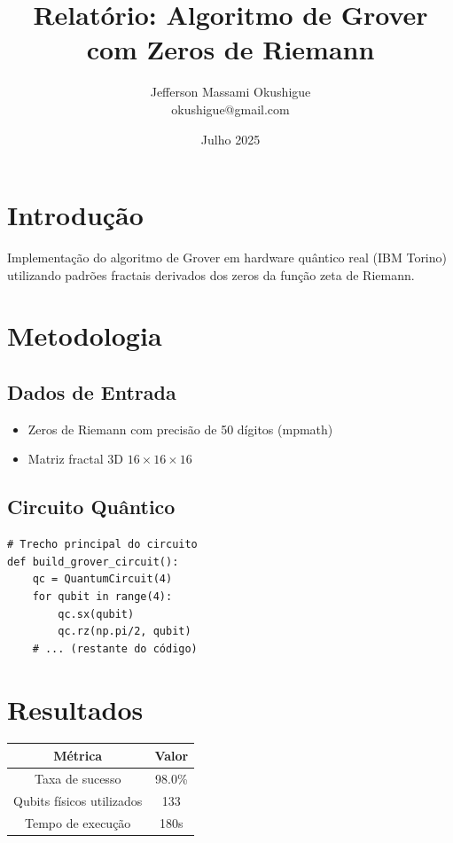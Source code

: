 \documentclass[12pt, a4paper]{article}
\title{Relatório: Algoritmo de Grover com Zeros de Riemann}
\author{Jefferson Massami Okushigue \\ \small{okushigue@gmail.com}}
\date{Julho 2025}
\begin{document}
\maketitle

\section{Introdução}
Implementação do algoritmo de Grover em hardware quântico real (IBM Torino) utilizando padrões fractais derivados dos zeros da função zeta de Riemann.

\section{Metodologia}
\subsection{Dados de Entrada}
\begin{itemize}
    \item Zeros de Riemann com precisão de 50 dígitos (mpmath)
    \item Matriz fractal 3D $16\times16\times16$
\end{itemize}

\subsection{Circuito Quântico}
\begin{verbatim}
# Trecho principal do circuito
def build_grover_circuit():
    qc = QuantumCircuit(4)
    for qubit in range(4):
        qc.sx(qubit)
        qc.rz(np.pi/2, qubit)
    # ... (restante do código)
\end{verbatim}

\section{Resultados}
\begin{table}[h]
\centering
\begin{tabular}{|c|c|}
\hline
\textbf{Métrica} & \textbf{Valor} \\ \hline
Taxa de sucesso & 98.0\% \\ 
Qubits físicos utilizados & 133 \\
Tempo de execução & 180s \\ \hline
\end{tabular}
\end{table}
\end{document}
